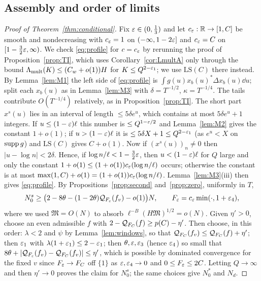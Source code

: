\documentclass[11pt]{amsart}
\theoremstyle{definition}
\theoremstyle{remark}
\numberwithin{equation}{section}
\begin{document}
\subsection{Assembly and order of limits}\label{sec:assembly}
\begin{proof}[Proof of Theorem~\ref{thm:conditional}]
Fix $\varepsilon\in(0,\frac13)$ and let $c_\varepsilon:\mathbb R\to[1,C]$ be smooth and nondecreasing with $c_\varepsilon=1$ on $(-\infty,1-2\varepsilon]$ and $c_\varepsilon=C$ on $[1-\frac32\varepsilon,\infty)$. We check \eqref{eq:profile} for $c=c_\varepsilon$ by rerunning the proof of Proposition~\ref{prop:TI}, which uses Corollary~\ref{cor:LmultA} only through the bound $\Lambda_{\mathrm{mult}}(K)\le(C_w+o(1))H$ for $K\le Q^{2-\varepsilon_1}$; we use $\mathrm{LS}(C)$ there instead. By Lemma~\ref{lem:M1} the left side of \eqref{eq:profile} is $\int g(u)x_b(u)^*\Delta x_b(u)\dd u$; split each $x_b(u)$ as in Lemma~\ref{lem:M3} with $\delta=T^{-1/2}$, $\kappa=T^{-1/4}$. The tails contribute $O(T^{-1/4})$ relatively, as in Proposition~\ref{prop:TI}. The short part $x^s(u)$ lies in an interval of length $\le5\delta e^u$, which contains at most $5\delta e^u+1$ integers. If $u\le(1-\varepsilon)\ell$ this number is $\le Q^{1-\varepsilon/2}$ and Lemma~\ref{lem:M2} gives the constant $1+o(1)$; if $u>(1-\varepsilon)\ell$ it is $\le5\delta X+1\le Q^{2-\varepsilon_1}$ (as $e^u<X$ on $\operatorname{supp} g$) and $\mathrm{LS}(C)$ gives $C+o(1)$. Now if $(x^s(u))_n\ne0$ then $|u-\log n|<2\delta$. Hence, if $\log n/\ell<1-\frac32\varepsilon$, then $u<(1-\varepsilon)\ell$ for $Q$ large and only the constant $1+o(1)\le(1+o(1))c_\varepsilon(\log n/\ell)$ occurs; otherwise the constant is at most $\max(1,C)+o(1)=(1+o(1))c_\varepsilon(\log n/\ell)$. Lemma~\ref{lem:M3}(iii) then gives \eqref{eq:profile}. By Propositions~\ref{prop:second} and~\ref{prop:zero}, uniformly in $T$,
\[
N^s_0\ge\big(2-8\theta-(1-2\theta)\mathcal Q_{F_\varepsilon}(f_v)-o(1)\big)N,\qquad F_\varepsilon=c_\varepsilon\min(\cdot,1+\varepsilon_4),
\]
where we used $\mathfrak M=O(N)$ to absorb $\ell^{-B}(H\mathfrak M)^{1/2}=o(N)$. Given $\eta'>0$, choose an even admissible $f$ with $2-\mathcal Q_{F_C}(f)\ge p(C)-\eta'$. Then choose, in this order: $\lambda<2$ and $\psi$ by Lemma~\ref{lem:windows}, so that $\mathcal Q_{F_C}(f_v)\le\mathcal Q_{F_C}(f)+\eta'$; then $\varepsilon_1$ with $\lambda(1+\varepsilon_1)\le2-\varepsilon_1$; then $\theta,\varepsilon,\varepsilon_3$ (hence $\varepsilon_4$) so small that $8\theta+|\mathcal Q_{F_\varepsilon}(f_v)-\mathcal Q_{F_C}(f_v)|\le\eta'$, which is possible by dominated convergence for the fixed $v$ since $F_\varepsilon\to F_C$ off $\{1\}$ as $\varepsilon,\varepsilon_4\to0$ and $0\le F_\varepsilon\le2C$. Letting $Q\to\infty$ and then $\eta'\to0$ proves the claim for $N^s_0$; the same choices give $N^*_0$ and $N_d$.
\end{proof}
\end{document}
